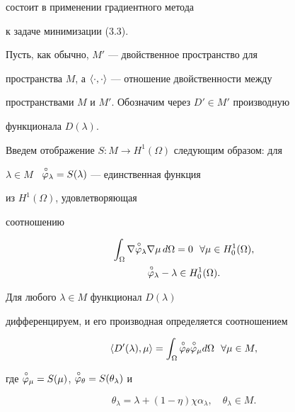 состоит в применении градиентного метода 


к задаче минимизации (3.3). 


 


Пусть, как обычно, $M'$ --- двойственное пространство для 


пространства $M$, а $\langle\cdot,\cdot\rangle$ --- отношение двойственности между 


пространствами $M$ и $M'$. Обозначим через $D'\in M'$ производную 


функционала $D(\lambda)$. 


Введем отображение $S:M\to H^1(\Omega)$ следующим образом: для 


$\lambda\in M$ \ $\overset{\,\circ}{\varphi}{}_\lambda=S(\lambda)$ --- единственная функция 


из $H^1(\Omega)$, удовлетворяющая 


соотношению 


\begin{gather} 


\int_\Omega\nabla\up{\varphi}_\lambda\nabla\mu\,d\Omega=0 


\ \ \forall\mu\in H^1_0(\Omega), \\ 


\up{\varphi}_\lambda-\lambda\in H^1_0(\Omega). \notag


\end{gather} 


 


\begin{thm} 


Для любого $\lambda\in M$ функционал $D(\lambda)$ 


дифференцируем, и его производная определяется соотношением 


$$ 


\la D'(\lambda),\mu\ra=\int_\Omega\up{\varphi}_\theta 


\up{\varphi}_\mu d\Omega\ \ \forall\mu\in M, 


$$ 


где $\overset{\,\circ}{\varphi}{}_\mu=S(\mu)$, $\overset{\,\circ}{\varphi}{}_\theta=S(\theta_\lambda)$ и 


\begin{equation} 


\theta_\lambda=\lambda+(1-\eta)\chi\alpha_\lambda,\quad 


\theta_\lambda\in M. 


\end{equation} 


\end{thm} 


